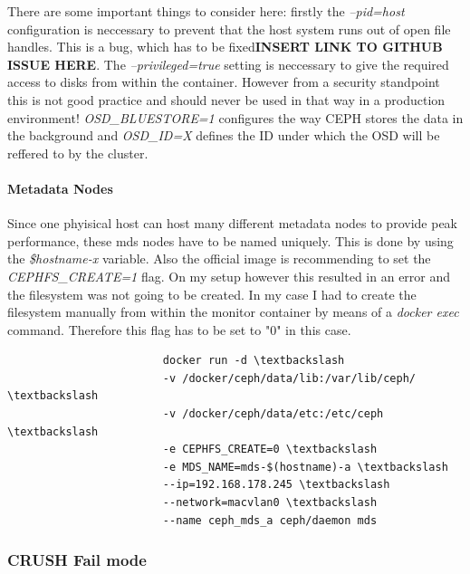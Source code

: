 \documentclass[titlepage, a4paper, 11pt]{scrartcl}
\begin{document}
                    There are some important things to consider here: firstly the \textit{--pid=host} configuration is neccessary to prevent that the host system
                    runs out of open file handles. This is a bug, which has to be fixed\textbf{INSERT LINK TO GITHUB ISSUE HERE}. The \textit{--privileged=true} setting
                    is neccessary to give the required access to disks from within the container. However from a security standpoint this is not good practice and should never be
                    used in that way in a production environment! \textit{OSD\_BLUESTORE=1} configures the way CEPH stores the data in the background and \textit{OSD\_ID=X} defines
                    the ID under which the OSD will be reffered to by the cluster.

                \paragraph{Metadata Nodes}

                    Since one phyisical host can host many different metadata nodes to provide peak performance, these mds nodes have to be named uniquely. This is done 
                    by using the \textit{\$hostname-x} variable. Also the official image is recommending to set the \textit{CEPHFS\_CREATE=1} flag. On my setup however this resulted in an 
                    error and the filesystem was not going to be created. In my case I had to create the filesystem manually from within the monitor container by means of a \textit{docker exec}
                    command. Therefore this flag has to be set to "0" in this case.

                    \begin{lstlisting}
                        docker run -d \textbackslash
                        -v /docker/ceph/data/lib:/var/lib/ceph/ \textbackslash
                        -v /docker/ceph/data/etc:/etc/ceph \textbackslash
                        -e CEPHFS_CREATE=0 \textbackslash
                        -e MDS_NAME=mds-$(hostname)-a \textbackslash
                        --ip=192.168.178.245 \textbackslash
                        --network=macvlan0 \textbackslash
                        --name ceph_mds_a ceph/daemon mds
                    \end{lstlisting}   
                    
            \subsubsection{CRUSH Fail mode}\label{system:crush-fail}
\end{document}
